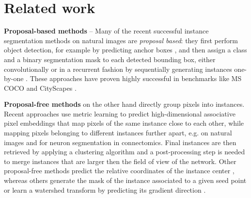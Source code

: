
\section{Related work} \label{sec:related_work}
\textbf{Proposal-based methods} -- Many of the recent successful instance segmentation methods on natural images are \emph{proposal based}: they first perform object detection, for example by predicting anchor boxes \cite{ren2015faster}, and then assign a class and a binary segmentation mask to each detected bounding box, either convolutionally \cite{he2017mask,porzi2019seamless,liu2018path,yang2012layered,li2017fully,ladicky2010and,hariharan2014simultaneous,chen2015multi,dai2016instance,liang2016reversible} or in a recurrent fashion by sequentially generating instances one-by-one \cite{romera2016recurrent,ren2017end}. These approaches have proven highly successful in benchmarks like MS COCO \cite{lin2014microsoft} and CityScapes \cite{cordts2016cityscapes}. 


\textbf{Proposal-free methods} on the other hand directly group pixels into instances. 
Recent approaches use metric learning to predict high-dimensional associative pixel embeddings that map pixels of the same instance close to each other, while mapping pixels belonging to different instances further apart, e.g. \cite{kong2018recurrentPix,fathi2017semantic,newell2017associative,de2017semantic} on natural images and \cite{lee2019learning} for neuron segmentation in connectomics. %
Final instances are then retrieved by applying a clustering algorithm and a post-processing step is needed to merge instances that are larger then the field of view of the network. 
Other proposal-free methods predict the relative coordinates of the instance center \cite{neven2019instance,cheng2019panopticdeeplab}, whereas others generate the mask of the instance associated to a given seed point \cite{sofiiuk2019adaptis} or  
learn a watershed transform by predicting its gradient direction \cite{bai2017deep}. 

